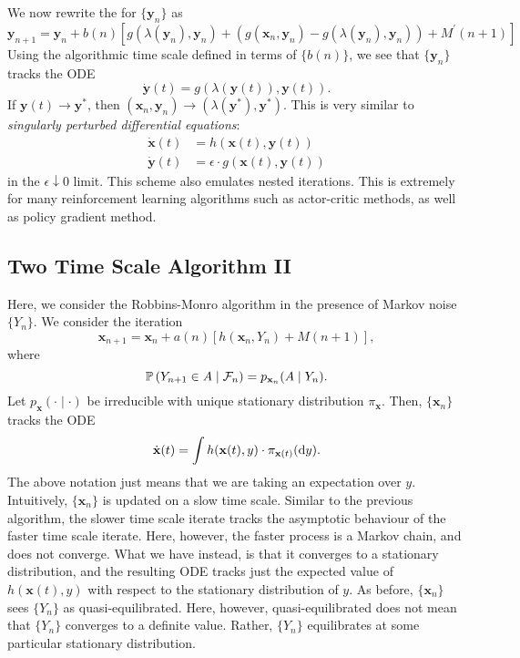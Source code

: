 We now rewrite the for $\{\mathbf{y}_n\}$ as 
\[
    \mathbf{y}_{n+1} = \mathbf{y}_n + b(n) \left[ g(\lambda(\mathbf{y}_n), \mathbf{y}_n) + \left(g(\mathbf{x}_n, \mathbf{y}_n) - g(\lambda(\mathbf{y}_n), \mathbf{y}_n) \right) + M^{\prime}(n+1) \right]
\]
Using the algorithmic time scale defined in terms of $\{b(n)\}$, we see that $\{\mathbf{y}_n\}$ tracks the ODE
\[
    \dot{\mathbf{y}}(t) = g\left( \lambda(\mathbf{y}(t)), \mathbf{y}(t) \right).
\]
If $\mathbf{y}(t) \to \mathbf{y}^*$, then $(\mathbf{x}_n,\mathbf{y}_n) \to (\lambda(\mathbf{y}^*), \mathbf{y}^*)$. This is very similar to \emph{singularly perturbed differential equations}:
\begin{align*}
    \dot{\mathbf{x}}(t) &= h(\mathbf{x}(t), \mathbf{y}(t)) \\
    \dot{\mathbf{y}}(t) &= \epsilon\cdot g(\mathbf{x}(t), \mathbf{y}(t)) 
\end{align*}
in the $\epsilon \downarrow 0$ limit. This scheme also emulates nested iterations. This is extremely for many reinforcement learning algorithms such as actor-critic methods, as well as policy gradient method. 

\subsection{Two Time Scale Algorithm II}

Here, we consider the Robbins-Monro algorithm in the presence of Markov noise $\{Y_n\}$. We consider the iteration
\[
    \mathbf{x}_{n+1} = \mathbf{x}_n + a(n) \left[ h(\mathbf{x}_n, Y_n) + M(n+1) \right],
\]
where 
\[
    \P \left( Y_{n+1} \in A \mid \mathcal{F}_n \right) = p_{\mathbf{x}_n} (A \mid Y_n). 
\]
Let $p_{\mathbf{x}}(\cdot\mid\cdot)$ be irreducible with unique stationary distribution $\pi_{\mathbf{x}}$. Then, $\{\mathbf{x}_n\}$ tracks the ODE
\[
    \dot{\mathbf{x}}(t) = \int h(\mathbf{x}(t), y) \cdot \pi_{\mathbf{x}(t)}(\D y).
\]
The above notation just means that we are taking an expectation over $y$. Intuitively, $\{\mathbf{x}_n\}$ is updated on a slow time scale. Similar to the previous algorithm, the slower time scale iterate tracks the asymptotic behaviour of the faster time scale iterate. Here, however, the faster process is a Markov chain, and does not converge. What we have instead, is that it converges to a stationary distribution, and the resulting ODE tracks just the expected value of $h(\mathbf{x}(t),y)$ with respect to the stationary distribution of $y$. As before, $\{\mathbf{x}_n\}$ sees $\{Y_n\}$ as quasi-equilibrated. Here, however, quasi-equilibrated does not mean that $\{Y_n\}$ converges to a definite value. Rather, $\{Y_n\}$ equilibrates at some particular stationary distribution. 

